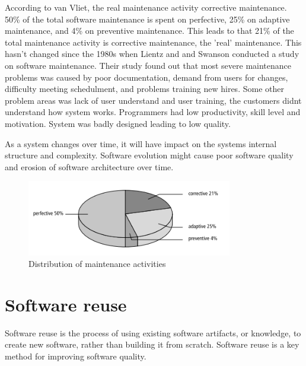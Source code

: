 According to van Vliet, the real maintenance activity corrective maintenance\cite{Vliet:2008:SEP:1481475}. 50\% of the total software maintenance is spent on perfective, 25\% on adaptive maintenance, and 4\% on preventive maintenance. This leads to that 21\% of the total maintenance activity is corrective maintenance, the 'real' maintenance\cite{Vliet:2008:SEP:1481475}. This hasn't changed since the 1980s when Lientz and and Swanson conducted a study on software maintenance\cite{lientz1980software}. Their study found out that most severe maintenance problems was caused by poor documentation, demand from users for changes, difficulty meeting schedulment, and problems training new hires.  Some other problem areas was lack of user understand and user training, the customers didnt understand how system works. Programmers had low productivity, skill level and motivation. System was badly designed leading to low quality. 

As a system changes over time, it will have impact on the systems internal structure and complexity. Software evolution might cause poor software quality and erosion of software architecture over time\cite{Bass:2012:SAP:2392670}.


\begin{figure}
	\centering
	\includegraphics[width=0.8\textwidth]{images/maintenance.png}
	\caption{Distribution of maintenance activities\cite{Vliet:2008:SEP:1481475}}
	\label{fig:maintenanceActivities}
\end{figure}

\section{Software reuse}
Software reuse is the process of using existing software artifacts, or knowledge, to create new software, rather than building it from scratch. Software reuse is a key method for improving software quality\cite{frakes1996software}. 

